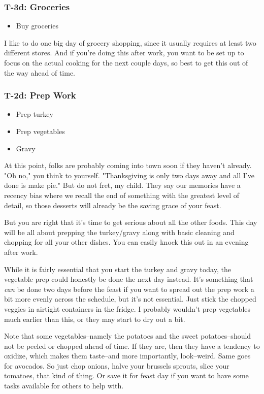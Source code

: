 \documentclass[12pt]{article}
\begin{document}
	\subsubsection{T-3d: Groceries}
	\begin{itemize}
		\item Buy groceries
	\end{itemize}
	
	I like to do one big day of grocery shopping, since it usually requires at least two different stores. And if you're doing this after work, you want to be set up to focus on the actual cooking for the next couple days, so best to get this out of the way ahead of time.
	
	\subsubsection{T-2d: Prep Work}
	\begin{itemize}
		\item Prep turkey
		\item Prep vegetables
		\item Gravy
	\end{itemize}
	
	At this point, folks are probably coming into town soon if they haven't already. "Oh no," you think to yourself. "Thanksgiving is only two days away and all I've done is make pie." But do not fret, my child. They say our memories have a recency bias where we recall the end of something with the greatest level of detail, so those desserts will already be the saving grace of your feast.
	
	But you are right that it's time to get serious about all the other foods. This day will be all about prepping the turkey/gravy along with basic cleaning and chopping for all your other dishes. You can easily knock this out in an evening after work.
	
	While it is fairly essential that you start the turkey and gravy today, the vegetable prep could honestly be done the next day instead. It's something that \textit{can} be done two days before the feast if you want to spread out the prep work a bit more evenly across the schedule, but it's not essential. Just stick the chopped veggies in airtight containers in the fridge. I probably wouldn't prep vegetables much earlier than this, or they may start to dry out a bit.
	
	Note that some vegetables--namely the potatoes and the sweet potatoes--should not be peeled or chopped ahead of time. If they are, then they have a tendency to oxidize, which makes them taste--and more importantly, look--weird. Same goes for avocados. So just chop onions, halve your brussels sprouts, slice your tomatoes, that kind of thing. Or save it for feast day if you want to have some tasks available for others to help with.
	
\end{document}
